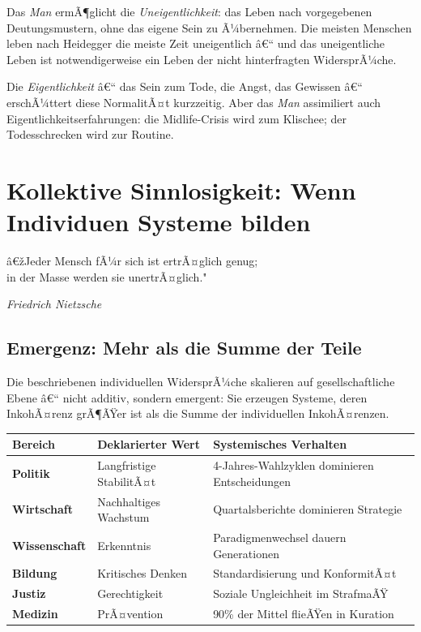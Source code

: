 ﻿\documentclass[12pt, a4paper]{article}
\begin{document}
Das \emph{Man} ermÃ¶glicht die \emph{Uneigentlichkeit}: das Leben nach
vorgegebenen Deutungsmustern, ohne das eigene Sein zu Ã¼bernehmen. Die meisten
Menschen leben nach Heidegger die meiste Zeit uneigentlich â€“ und das uneigentliche
Leben ist notwendigerweise ein Leben der nicht hinterfragten WidersprÃ¼che.

Die \emph{Eigentlichkeit} â€“ das Sein zum Tode, die Angst, das Gewissen â€“
erschÃ¼ttert diese NormalitÃ¤t kurzzeitig. Aber das \emph{Man} assimiliert auch
Eigentlichkeitserfahrungen: die Midlife-Crisis wird zum Klischee; der Todesschrecken
wird zur Routine.

\section{Kollektive Sinnlosigkeit: Wenn Individuen Systeme bilden}

\epigraph{â€žJeder Mensch fÃ¼r sich ist ertrÃ¤glich genug;\\
in der Masse werden sie unertrÃ¤glich."}{\textit{Friedrich Nietzsche}}

\subsection{Emergenz: Mehr als die Summe der Teile}

Die beschriebenen individuellen WidersprÃ¼che skalieren auf gesellschaftliche
Ebene â€“ nicht additiv, sondern emergent: Sie erzeugen Systeme, deren
InkohÃ¤renz grÃ¶ÃŸer ist als die Summe der individuellen InkohÃ¤renzen.

\medskip
\begin{tabular}{>{\bfseries}p{3.5cm} p{5cm} p{5cm}}
\toprule
Bereich & Deklarierter Wert & Systemisches Verhalten \\
\midrule
Politik & Langfristige StabilitÃ¤t & 4-Jahres-Wahlzyklen dominieren Entscheidungen \\
Wirtschaft & Nachhaltiges Wachstum & Quartalsberichte dominieren Strategie \\
Wissenschaft & Erkenntnis & Paradigmenwechsel dauern Generationen \\
Bildung & Kritisches Denken & Standardisierung und KonformitÃ¤t \\
Justiz & Gerechtigkeit & Soziale Ungleichheit im StrafmaÃŸ \\
Medizin & PrÃ¤vention & 90\% der Mittel flieÃŸen in Kuration \\
\bottomrule
\end{tabular}
\medskip
\end{document}
